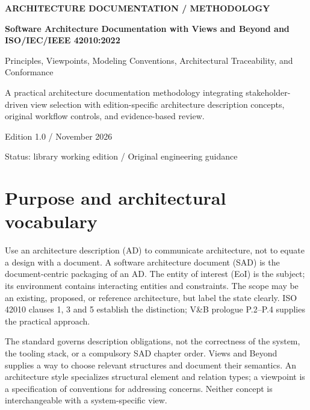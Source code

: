 \documentclass[11pt,letterpaper]{article}
\newcommand{\docsection}[1]{\Needspace{5\baselineskip}\section{#1}}
\begin{document}
\begin{titlepage}\thispagestyle{empty}\raggedright
\vspace*{0.65in}
{\sffamily\bfseries\color{teal} ARCHITECTURE DOCUMENTATION / METHODOLOGY\par}
\vspace{0.35in}
{\sffamily\bfseries\color{navy}\Huge Software Architecture Documentation with Views and Beyond and ISO/IEC/IEEE 42010:2022\par}
\vspace{0.2in}
{\sffamily\Large\color{muted} Principles, Viewpoints, Modeling Conventions, Architectural Traceability, and Conformance\par}
\vspace{0.35in}\noindent{\color{teal}\rule{\linewidth}{1.5pt}}\par
\vspace{0.3in}
A practical architecture documentation methodology integrating stakeholder-driven view selection with edition-specific architecture description concepts, original workflow controls, and evidence-based review.

\vfill
{\sffamily\small Edition 1.0 \quad /  November 2026\par
Status: library working edition \quad / \quad Original engineering guidance\par}
\end{titlepage}
\tableofcontents\clearpage
\docsection{Purpose and architectural vocabulary}
Use an architecture description (AD) to communicate architecture, not to equate a design with a document. A software architecture document (SAD) is the document-centric packaging of an AD. The entity of interest (EoI) is the subject; its environment contains interacting entities and constraints. The scope may be an existing, proposed, or reference architecture, but label the state clearly. ISO 42010 clauses 1, 3 and 5 establish the distinction; V\&B prologue P.2--P.4 supplies the practical approach.

The standard governs description obligations, not the correctness of the system, the tooling stack, or a compulsory SAD chapter order. Views and Beyond supplies a way to choose relevant structures and document their semantics. An architecture style specializes structural element and relation types; a viewpoint is a specification of conventions for addressing concerns. Neither concept is interchangeable with a system-specific view.
\end{document}
